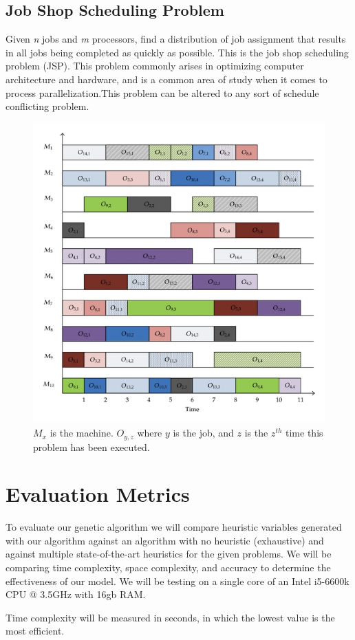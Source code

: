\documentclass[10pt,twoside]{IEEEtran}
\begin{document}
\subsection{Job Shop Scheduling Problem}
Given \emph{n} jobs and \emph{m} processors, find a distribution of job assignment that results in all jobs being completed as quickly as possible. This is the job shop scheduling problem (JSP). This problem commonly arises in optimizing computer architecture and hardware, and is a common area of study when it comes to process parallelization.This problem can be altered to any sort of schedule conflicting problem.

\begin{figure}[h]
	\centering
	\includegraphics[width=0.7\linewidth]{../diagrams/jsp.jpg}
	\caption{$M_{x}$ is the machine. $O_{y,z}$ where $y$ is the job, and $z$ is the $z^{th}$ time this problem has been executed.}
	\label{JSS Fig}
\end{figure}

\section{Evaluation Metrics}
To evaluate our genetic algorithm we will compare heuristic variables generated with our algorithm against an algorithm with no heuristic (exhaustive) and against multiple state-of-the-art heuristics for the given problems. We will be comparing time complexity, space complexity, and accuracy to determine the effectiveness of our model. We will be testing on a single core of an Intel i5-6600k CPU @ 3.5GHz with 16gb RAM.

Time complexity will be measured in seconds, in which the lowest value is the most efficient.
\end{document}
